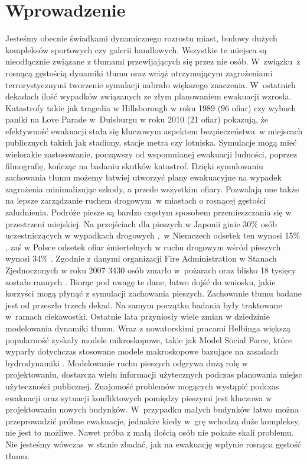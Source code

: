 \chapter{Wprowadzenie}
\label{cha:wprowadzenie}

Jesteśmy obecnie świadkami dynamicznego rozrostu miast, budowy dużych kompleksów sportowych czy galerii handlowych. Wszystkie te miejsca są nieodłącznie związane z tłumami przewijających się przez nie osób. W~związku~z rosnącą gęstością dynamiki tłumu oraz wciąż utrzymującym zagrożeniami terrorystycznymi \cite{terrorism} tworzenie symulacji nabrało większego znaczenia. W~ostatnich dekadach ilość wypadków związanych ze złym planowaniem ewakuacji wzrosła. Katastrofy takie jak tragedia w Hillsborough w roku 1989 (96 ofiar) \cite{hillsborough} czy wybuch paniki na Love Parade w~Duisburgu w roku 2010 (21 ofiar) \cite{lovedisaster} pokazują, że efektywność ewakuacji stała się kluczowym aspektem bezpieczeństwa~w miejscach publicznych takich jak stadiony, stacje metra czy lotniska. Symulacje mogą mieć wielorakie zastosowanie, począwszy od wspomnianej ewakuacji ludności, poprzez filmografię, kończąc na badaniu skutków katastrof. Dzięki symulowaniu zachowania tłumu możemy łatwiej utworzyć plany ewakuacyjne na wypadek zagrożenia minimalizując szkody, a przede wszystkim ofiary. Pozwalają one także na lepsze zarządzanie ruchem drogowym~w miastach o rosnącej gęstości zaludnienia.
Podróże piesze są bardzo częstym sposobem przemieszczania się w przestrzeni miejskiej. Na przejściach dla pieszych w Japonii ginie 30\% osób uczestniczących w wypadkach drogowych \cite{AMSFMfPBSaSC},~w Niemczech odsetek ten wynosi 15\% \cite{germanInstitute}, zaś w Polsce odsetek ofiar śmiertelnych w ruchu drogowym wśród pieszych wynosi 34\% \cite{metodologiaZachowan}. Zgodnie z danymi organizacji Fire Administration w Stanach Zjednoczonych w roku 2007 3430 osób zmarło w~pożarach oraz blisko 18 tysięcy zostało rannych \cite{Asfemwle}. Biorąc pod uwagę te dane, łatwo dojść do wniosku, jakie korzyści mogą płynąć z symulacji zachowania pieszych.
Zachowanie tłumu badane jest od przeszło trzech dekad. Na samym początku badania były traktowane w~ramach ciekawostki. Ostatnie lata przyniosły wiele zmian w dziedzinie modelowania dynamiki tłumu. Wraz z nowatorskimi pracami Helbinga \cite{SforceModelForPedDyn} większą popularność zyskały modele mikroskopowe, takie jak Model Social Force, które wyparły dotychczas stosowane modele makroskopowe bazujące na zasadach hydrodynamiki  \cite{SforceModelForPedDyn}. Modelowanie ruchu pieszych odgrywa dużą rolę w projektowaniu, dostarcza wielu informacji użytecznych podczas planowania miejsc użyteczności publicznej. Znajomość problemów mogących wystąpić podczas ewakuacji oraz sytuacji konfliktowych pomiędzy pieszymi jest kluczowa w projektowaniu nowych budynków. W~przypadku małych budynków łatwo można przeprowadzić próbne ewakuacje, jednakże kiedy w~grę wchodzą duże kompleksy, nie jest to możliwe. Nawet próba z małą ilością osób nie pokaże skali problemu. Nie jesteśmy wówczas~w stanie zbadać, jak na ewakuację wpłynie rosnąca gęstość tłumu.
